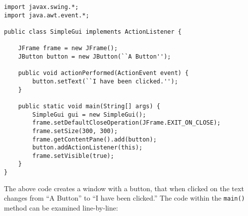 \documentclass{tufte-handout}
\begin{document}
    \begin{lstlisting}
import javax.swing.*;
import java.awt.event.*;

public class SimpleGui implements ActionListener {

    JFrame frame = new JFrame();
    JButton button = new JButton(``A Button'');  

    public void actionPerformed(ActionEvent event) {
        button.setText(``I have been clicked.'');
    }

    public static void main(String[] args) {
        SimpleGui gui = new SimpleGui();
        frame.setDefaultCloseOperation(JFrame.EXIT_ON_CLOSE);
        frame.setSize(300, 300);
        frame.getContentPane().add(button);
        button.addActionListener(this);
        frame.setVisible(true);
    }
}
    \end{lstlisting}

    The above code creates a window with a button, that when clicked on the text changes from ``A Button'' to ``I have been clicked.'' The code within the \texttt{main()} method can be examined line-by-line:
\end{document}
